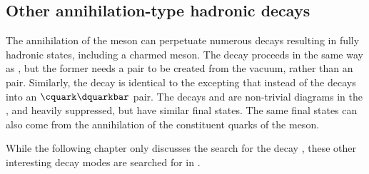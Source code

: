 



\subsection{Other annihilation-type hadronic decays}
The annihilation of the \Bp meson can perpetuate numerous decays resulting in fully hadronic
states, including a charmed meson.
The decay \decay{\Bp}{\Dp\Kstarz} proceeds in the same way as
\btodsphi, but the former needs a \ddbar pair to be created from the \QCD vacuum, rather than an
\ssbar pair.
Similarly, the decay \decay{\Bp}{\Ds\Kstarzb} is identical to the \btodsphi excepting that instead
of \decay{\Wp}{\cquark\squarkbar} the \Wp decays into an $\cquark\dquarkbar$ pair.
The decays \decay{\Bp}{\Dp\Kstarzb} and \decay{\Bp}{\Ds\Kstarz} are non-trivial diagrams in the
\sm, and heavily suppressed, but have similar final states.
The same final states can also come from the annihilation of the constituent
quarks of the \Bc meson.

While the following chapter only discusses the search for the decay \btodsphi, these other
interesting decay modes are searched for in
.






